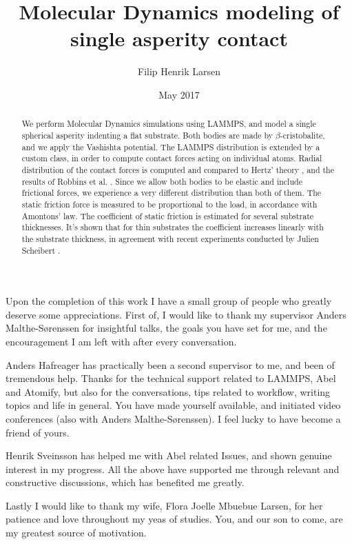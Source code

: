 \documentclass[twoside,english]{uiofysmaster}
\author{Filip Henrik Larsen}
\title{Molecular Dynamics modeling of single asperity contact}
\date{May 2017}
\begin{document}
\maketitle

\begin{abstract}
We perform Molecular Dynamics simulations using LAMMPS, and model a single spherical asperity indenting a flat substrate.
Both bodies are made by $\beta$-cristobalite, and we apply the Vashishta potential.
The LAMMPS distribution is extended by a custom class, in order to compute contact forces acting on individual atoms.  
Radial distribution of the contact forces is computed and compared to Hertz' theory \cite{Johnson1985}, and the results of Robbins et al. \cite{RobbinsSingleAsperity}. 
Since we allow both bodies to be elastic and include frictional forces, we experience a very different distribution than both of them. 
The static friction force is measured to be proportional to the load, in accordance with Amontons' law.
The coefficient of static friction is estimated for several substrate thicknesses. 
It's shown that for thin substrates the coefficient increases linearly with the substrate thickness, in agreement with recent experiments conducted by Julien Scheibert \cite{Scheibert2017}.




   
\end{abstract}


\begin{acknowledgements}
Upon the completion of this work I have a small group of people who greatly deserve some appreciations. 
First of, I would like to thank my supervisor Anders Malthe-Sørenssen for insightful talks, the goals you have set for me, and the encouragement I am left with after every conversation.

Anders Hafreager has practically been a second supervisor to me, and been of tremendous help. 
Thanks for the technical support related to LAMMPS, Abel and Atomify, but also for the conversations, tips related to workflow, writing topics and life in general. 
You have made yourself available, and initiated video conferences (also with Anders Malthe-Sørenssen).
I feel lucky to have become a friend of yours. 

Henrik Sveinsson has helped me with Abel related Issues, and shown genuine interest in my progress. 
All the above have supported me through relevant and constructive discussions, which has benefited me greatly. 

Lastly I would like to thank my wife, Flora Joelle Mbuebue Larsen, for her patience and love throughout my yeas of studies. 
You, and our son to come, are my greatest source of motivation.  



	
	

\end{acknowledgements}
{
\hypersetup{linkcolor = black}
\tableofcontents
}
\end{document}
